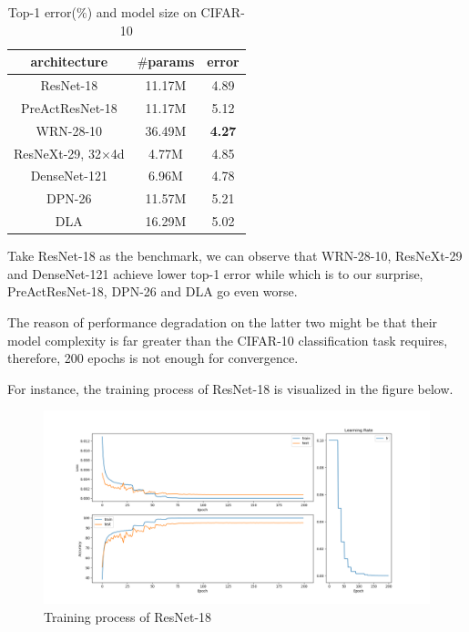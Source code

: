 \documentclass[a4paper, 11pt]{article} %
\begin{document}
\begin{table}[H]
	\begin{center}
		\begin{tabular}{ccc}
			\toprule
			architecture             & $\#$params & error         \\
			\midrule
			ResNet-18                & 11.17M     & 4.89          \\
			PreActResNet-18          & 11.17M     & 5.12          \\
			WRN-28-10                & 36.49M     & \textbf{4.27} \\
			ResNeXt-29, 32$\times$4d & 4.77M      & 4.85          \\
			DenseNet-121             & 6.96M      & 4.78          \\
			DPN-26                   & 11.57M     & 5.21          \\
			DLA                      & 16.29M     & 5.02          \\
			\bottomrule
		\end{tabular}
		\caption{Top-1 error($\%$) and model size on CIFAR-10}
	\end{center}
\end{table}

Take ResNet-18 as the benchmark, we can observe that WRN-28-10, ResNeXt-29 and DenseNet-121
achieve lower top-1 error while which is to our surprise, PreActResNet-18, DPN-26 and DLA
go even worse.

The reason of performance degradation on the latter two might be that their model complexity
is far greater than the CIFAR-10 classification task requires, therefore, 200 epochs is not
enough for convergence.

For instance, the training process of ResNet-18 is visualized in the figure below.

\begin{figure}[H]
	\centering
	\includegraphics[width=1.0\textwidth]{./img/resnet-18.png}
	\caption{Training process of ResNet-18}
\end{figure}
\end{document}
